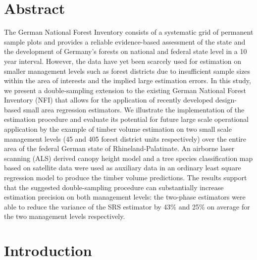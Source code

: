 \section*{Abstract}
\label{chap:sae:Abstract}
The German National Forest Inventory consists of a systematic grid of permanent sample plots and provides a reliable evidence-based assessment of the state and the development of Germany's forests on national and federal state level in a 10 year interval. However, the data have yet been scarcely used for estimation on smaller management levels such as forest districts due to insufficient sample sizes within the area of interests and the implied large estimation errors. In this study, we present a double-sampling extension to the existing German National Forest Inventory (NFI) that allows for the application of recently developed design-based small area regression estimators. We illustrate the implementation of the estimation procedure and evaluate its potential for future large scale operational application by the example of timber volume estimation on two small scale management levels (45 and 405 forest district units respectively) over the entire area of the federal German state of Rhineland-Palatinate. An airborne laser scanning (ALS) derived canopy height model and a tree species classification map based on satellite data were used as auxiliary data in an ordinary least square regression model to produce the timber volume predictions. The results support that the suggested double-sampling procedure can substantially increase estimation precision on both management levels: the two-phase estimators were able to reduce the variance of the SRS estimator by 43\% and 25\% on average for the two management levels respectively.



\section{Introduction}
\label{sec:sae:intro}

